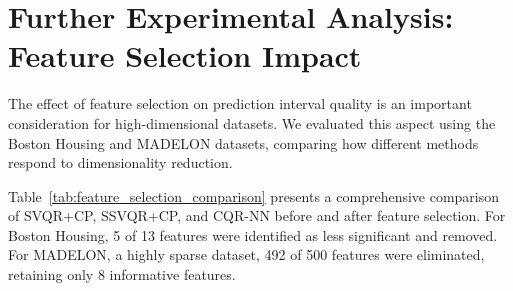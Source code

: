 \documentclass{article}
\begin{document}
\section{Further Experimental Analysis: Feature Selection Impact}
\label{sec:feature_selection}

The effect of feature selection on prediction interval quality is an important consideration for high-dimensional datasets. We evaluated this aspect using the Boston Housing and MADELON datasets, comparing how different methods respond to dimensionality reduction.

Table~\ref{tab:feature_selection_comparison} presents a comprehensive comparison of SVQR+CP, SSVQR+CP, and CQR-NN before and after feature selection. For Boston Housing, 5 of 13 features were identified as less significant and removed. For MADELON, a highly sparse dataset, 492 of 500 features were eliminated, retaining only 8 informative features.

\begin{table}[h!]
  \centering
  \caption{Impact of feature selection on prediction interval performance. For Boston Housing, 5 of 13 features were removed; for MADELON, 492 of 500 features were eliminated. Retention indicates the percentage of original features kept. Training times show significant improvements, especially for SSVQR+CP with sparse data.}
  \label{tab:feature_selection_comparison}
\end{table}
\end{document}
